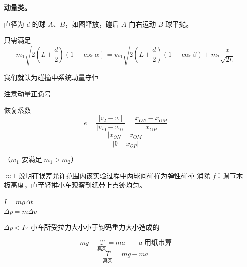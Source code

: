 \textbf{动量类。}

直径为 $d$ 的球 $A$、$B$，如图释放，碰后 $A$ 向右运动 $B$ 球平抛。


只需满足
\[ m_1\sqrt{2\left(L+\frac{d}{2}\right)(1-\cos\alpha)}=m_1\sqrt{2\left(L+\frac{d}{2}\right)(1-\cos\beta)}+m_2\frac{x}{\sqrt{2h}} \]

我们就认为碰撞中系统动量守恒

注意动量正负号 %

恢复系数
\[ e=\frac{|v_2-v_1|}{|v_{20}-v_{10}|}=\frac{x_{ON}-x_{OM}}{x_{OP}} \]
\[ \frac{|x_{ON}-x_{OM}|}{|0-x_{OP}|} \]

（$m_1$ 要满足 $m_1>m_2$）

$\approx1$ 说明在误差允许范围内该实验过程中两球间碰撞为弹性碰撞
消除 $f$：调节木板高度，直至轻推小车观察到纸带上点迹均匀。


$I=mg\Delta t$\\
$\Delta p=m\Delta v$

$\Delta p<I$\quad $\because$ 小车所受拉力大小小于钩码重力大小造成的

\[ mg-\underset{\text{真实}}{T}=ma\qquad a\text{ 用纸带算} \]
\[ \underset{\text{真实}}{T}=mg-ma \]

